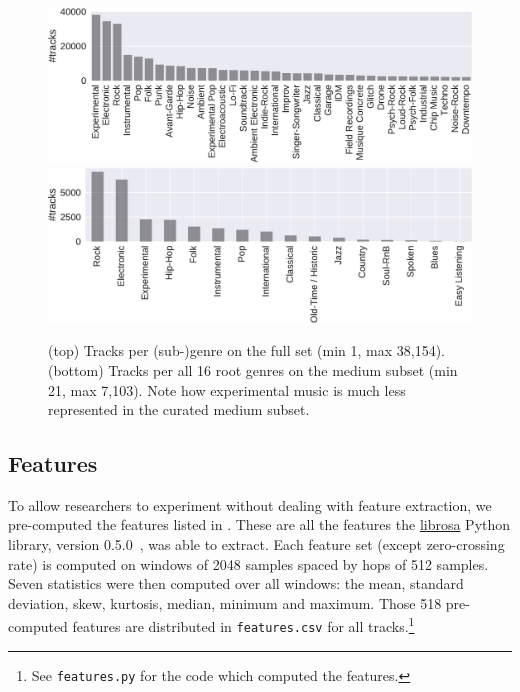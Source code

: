 \documentclass{article}
\begin{document}
\begin{figure}[t]
	\centering
	\includegraphics[width=\linewidth]{genre_distribution.pdf}
	\\ \vspace{1em}
	\includegraphics[width=\linewidth]{genre_top_distribution.pdf}
	\caption{(top) Tracks per (sub-)genre on the full set (min 1, max 38,154). (bottom) Tracks per all 16 root genres on the medium subset (min 21, max 7,103). Note how experimental music is much less represented in the curated medium subset.}
	\label{fig:genre_distribution}
	\label{fig:genre_top_distribution}
\end{figure}

\subsection{Features} %

To allow researchers to experiment without dealing with feature extraction, we pre-computed the features listed in . These are all the features the \href{https://github.com/librosa/librosa}{librosa} Python library, version 0.5.0~\cite{librosa}, was able to extract.
Each feature set (except zero-crossing rate) is computed on windows of 2048 samples spaced by hops of 512 samples. Seven statistics were then computed over all windows: the mean, standard deviation, skew, kurtosis, median, minimum and maximum.
Those 518 pre-computed features are distributed in \texttt{features.csv} for all tracks.\footnote{See \texttt{features.py} for the code which computed the features.}
\end{document}
